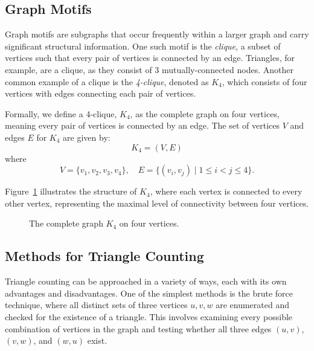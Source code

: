 \documentclass[11pt]{article}
\begin{document}
\subsection{Graph Motifs}

Graph motifs are subgraphs that occur frequently within a larger graph and carry significant structural information.
One such motif is the \emph{clique}, a subset of vertices such that every pair of vertices is connected by an edge.
Triangles, for example, are a clique, as they consist of 3 mutually-connected nodes.
Another common example of a clique is the \emph{4-clique}, denoted as \( K_4 \), which consists of four vertices with edges connecting each pair of vertices.

Formally, we define a 4-clique, \( K_4 \), as the complete graph on four vertices, meaning every pair of vertices is connected by an edge. The set of vertices \( V \) and edges \( E \) for \( K_4 \) are given by:
\[
K_4 = (V, E)
\]
where  
\[
V = \{ v_1, v_2, v_3, v_4 \}, \quad
E = \{ (v_i, v_j) \mid 1 \leq i < j \leq 4 \}.
\]

Figure~\ref{fig:k4} illustrates the structure of \( K_4 \), where each vertex is connected to every other vertex, representing the maximal level of connectivity between four vertices.

\begin{figure}[H]
    \centering
    \caption{The complete graph \( K_4 \) on four vertices.}
    \label{fig:k4}
\end{figure}

\subsection{Methods for Triangle Counting}

Triangle counting can be approached in a variety of ways, each with its own advantages and disadvantages. 
One of the simplest methods is the brute force technique, where all distinct sets of three vertices ${u, v, w}$ are enumerated and checked for the existence of a triangle.
This involves examining every possible combination of vertices in the graph and testing whether all three edges $(u, v)$, $(v, w)$, and $(w, u)$ exist. 
\end{document}
